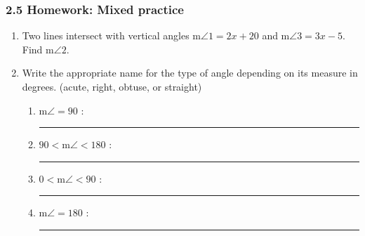 

\fancyhead[LE]{\thepage}



\subsubsection*{2.5 Homework: Mixed practice}
\begin{enumerate}
\item Two lines intersect with vertical angles m$\angle 1=2x+20$ and m$\angle 3=3x-5$. Find m$\angle 2$.
  \begin{flushleft}
  \end{flushleft}

\item Write the appropriate name for the type of angle depending on its measure in degrees. (acute, right, obtuse, or straight)
    \begin{enumerate}
      \item m$\angle = 90$ : \rule{4cm}{0.15mm} \bigskip
      \item $90 < \text{m}\angle < 180$ : \rule{4cm}{0.15mm} \bigskip
      \item $0< \text{m}\angle < 90$ : \rule{4cm}{0.15mm} \bigskip
      \item m$\angle = 180$ : \rule{4cm}{0.15mm} \bigskip
    \end{enumerate}


\end{enumerate}
